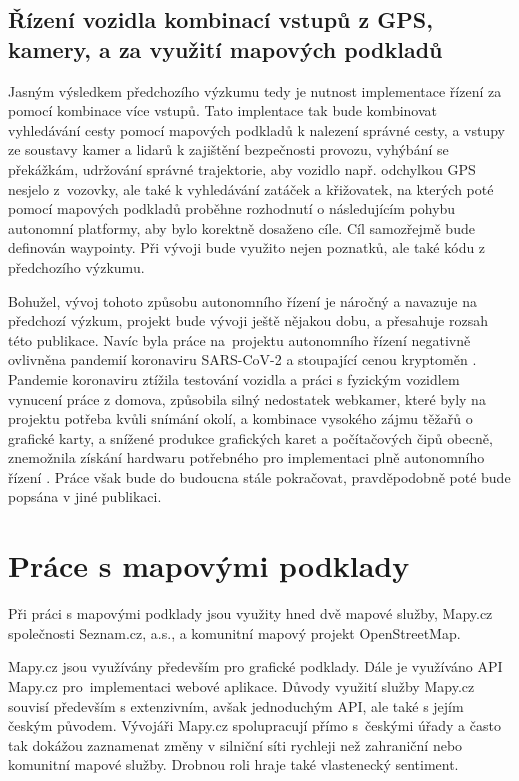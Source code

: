 \documentclass[czech, bachelor]{diploma}
\begin{document}
\section{Řízení vozidla kombinací vstupů z GPS, kamery, a za využití mapových podkladů} \label{combination-of-driving-inputs}

Jasným výsledkem předchozího výzkumu tedy je nutnost implementace řízení za pomocí kombinace více vstupů. Tato implentace tak bude
kombinovat vyhledávání cesty pomocí mapových podkladů k nalezení správné cesty, a vstupy ze soustavy kamer a lidarů k zajištění
bezpečnosti provozu, vyhýbání se překážkám, udržování správné trajektorie, aby vozidlo např. odchylkou GPS nesjelo z~vozovky,
ale také k vyhledávání zatáček a křižovatek, na kterých poté pomocí mapových podkladů proběhne rozhodnutí o následujícím pohybu
autonomní platformy, aby bylo korektně dosaženo cíle. Cíl samozřejmě bude definován waypointy. Při vývoji bude využito nejen
poznatků, ale také kódu z předchozího výzkumu.

Bohužel, vývoj tohoto způsobu autonomního řízení je náročný a navazuje na předchozí výzkum, projekt bude vývoji ještě nějakou
dobu, a přesahuje rozsah této publikace. Navíc byla práce na~projektu autonomního řízení negativně ovlivněna pandemií koronaviru
SARS-CoV-2 \cite{pandemic-source} a stoupající cenou kryptoměn \cite{bitcoin-rally-source}. Pandemie koronaviru ztížila testování
vozidla a práci s fyzickým vozidlem vynucení práce z domova, způsobila silný nedostatek webkamer, které byly na projektu potřeba
kvůli snímání okolí, a kombinace vysokého zájmu těžařů o grafické karty, a snížené produkce grafických karet a počítačových čipů
obecně, znemožnila získání hardwaru potřebného pro implementaci plně autonomního řízení
\cite{bitcoin-miners-gpu-source,webcam-shortage-source}. Práce však bude do budoucna stále pokračovat, pravděpodobně poté bude
popsána v jiné publikaci.

\chapter{Práce s mapovými podklady} \label{osm-chapter}

Při práci s mapovými podklady jsou využity hned dvě mapové služby, Mapy.cz společnosti Seznam.cz, a.s., a komunitní mapový projekt
OpenStreetMap.

Mapy.cz jsou využívány především pro grafické podklady. Dále je využíváno API Mapy.cz pro~implementaci webové aplikace. Důvody
využití služby Mapy.cz souvisí především s extenzivním, avšak jednoduchým API, ale také s jejím českým původem. Vývojáři Mapy.cz
spolupracují přímo s~českými úřady a často tak dokážou zaznamenat změny v silniční síti rychleji než zahraniční nebo komunitní
mapové služby. Drobnou roli hraje také vlastenecký sentiment.
\end{document}
